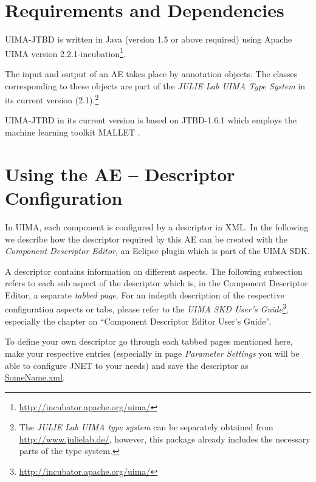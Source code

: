 \documentclass[11pt,a4paper,halfparskip]{scrartcl}
\begin{document}


\section{Requirements and Dependencies}

UIMA-JTBD is written in Java (version 1.5 or above required) using
Apache UIMA version
2.2.1-incubation\footnote{\url{http://incubator.apache.org/uima/}}.

The input and output of an AE takes place by annotation objects. The
classes corresponding to these objects are part of the \emph{JULIE Lab
  UIMA Type System} in its current version (2.1).\footnote{The
  \emph{JULIE Lab UIMA type system} can be separately obtained from
  \url{http://www.julielab.de/}, however, this package already
  includes the necessary parts of the type system.}

UIMA-JTBD in its current version is based on JTBD-1.6.1 which employs
the machine learning toolkit MALLET \cite{McCallum2002}.




\section{Using the AE -- Descriptor Configuration}

In UIMA, each component is configured by a descriptor in XML. In the
following we describe how the descriptor required by this AE can be
created with the \emph{Component Descriptor Editor}, an Eclipse plugin
which is part of the UIMA SDK.

A descriptor contains information on different aspects. The following
subsection refers to each sub aspect of the descriptor which is, in
the Component Descriptor Editor, a separate \emph{tabbed page}. For an
indepth description of the respective configuration aspects or tabs,
please refer to the \emph{UIMA SKD User's
  Guide}\footnote{\url{http://incubator.apache.org/uima/}}, especially
the chapter on ``Component Descriptor Editor User's Guide''.

To define your own descriptor go through each tabbed pages mentioned
here, make your respective entries (especially in page \emph{Parameter
  Settings} you will be able to configure JNET to your needs) and save
the descriptor as \url{SomeName.xml}.
\end{document}
